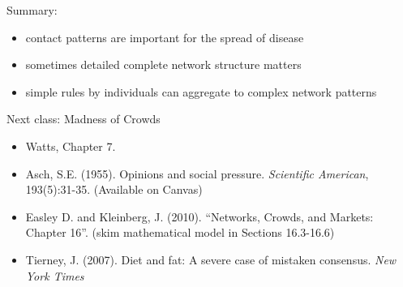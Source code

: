 \documentclass[aspectratio=169]{beamer}
\begin{document}
\begin{frame}

Summary:
\begin{itemize}
\item contact patterns are important for the spread of disease
\pause
\item sometimes detailed complete network structure matters
\pause
\item simple rules by individuals can aggregate to complex network patterns
\end{itemize}

\end{frame}
\begin{frame}

Next class: Madness of Crowds
\begin{itemize}
\item Watts, Chapter 7.
\item Asch, S.E. (1955). Opinions and social pressure. \textit{Scientific American}, 193(5):31-35. (Available on Canvas)
\item Easley D. and Kleinberg, J. (2010). ``Networks, Crowds, and Markets: Chapter 16''. (skim mathematical model in Sections 16.3-16.6)
\item Tierney, J. (2007). Diet and fat: A severe case of mistaken consensus. \textit{New York Times}
\end{itemize}

\end{frame}
\end{document}
